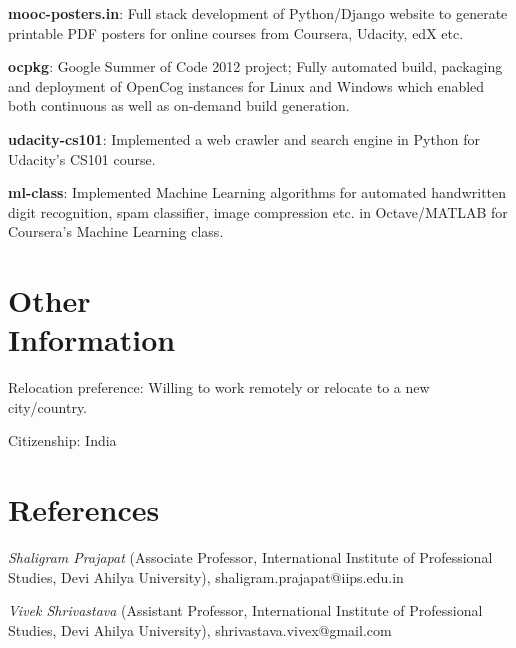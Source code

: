 \documentclass[margin,line]{resume}
\begin{document}
\begin{resume}
\begin{list2}
	\item \textbf{mooc-posters.in}: Full stack development of Python/Django website to generate printable PDF posters for online courses from Coursera, Udacity, edX etc.
	\item \textbf{ocpkg}: Google Summer of Code 2012 project; Fully automated build, packaging and deployment of OpenCog instances for Linux and Windows which enabled both continuous as well as on-demand build generation.
	\item \textbf{udacity-cs101}: Implemented a web crawler and search engine in Python for Udacity's CS101 course.
	\item \textbf{ml-class}: Implemented Machine Learning algorithms for automated handwritten digit recognition, spam classifier, image compression etc. in Octave/MATLAB for Coursera's Machine Learning class.
    \end{list2}

    \section{\mysidestyle Other \\ Information}
    \begin{list2}
    \item Relocation preference: Willing to work remotely or relocate to a new city/country.
    \item Citizenship: India
    \end{list2}

    \section{\mysidestyle References} 

    \begin{list2}
    \item {\sl Shaligram Prajapat} (Associate Professor, International Institute of Professional Studies, Devi Ahilya University), shaligram.prajapat@iips.edu.in
	\item {\sl Vivek Shrivastava} (Assistant Professor, International Institute of Professional Studies, Devi Ahilya University), shrivastava.vivex@gmail.com
    \end{list2}

\end{resume}
\end{document}
